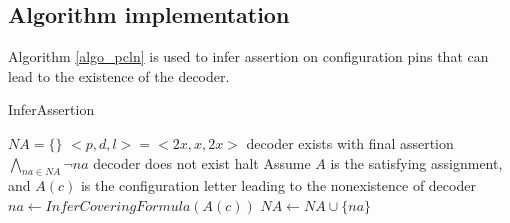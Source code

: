 \documentclass[journal]{IEEEtran}
\begin{document}
\subsection{Algorithm implementation}\label{subsec_algo}
Algorithm \ref{algo_pcln} is used to infer assertion on configuration pins that can lead to the existence of the decoder.

\begin{algorithm}
\caption{InferAssertion}
\label{algo_pcln}
\begin{algorithmic}[1]
\STATE $NA=\{\}$
\STATE $<p,d,l>=<2x,x,2x>$
\label{algo_pcln_pdl}
\label{algo_pcln_pc}
\STATE decoder exists with final assertion $\bigwedge_{na\in NA}\neg na$
\ELSE
\STATE decoder does not exist
\ENDIF
\STATE halt
\label{algo_pcln_halt}
\ELSE
{}
\label{algo_pcln_lnc}
\STATE Assume $A$ is the satisfying assignment, and $A(c)$ is the configuration letter leading to the nonexistence of decoder
\label{algo_pcln_Ac}
\STATE $na\leftarrow InferCoveringFormula(A(c))$
\label{algo_pcln_nainfer}
\STATE $NA\leftarrow NA\cup \{na\}$
\label{algo_pcln_ruleout}
\ENDWHILE
\ENDIF
\ENDFOR
\end{algorithmic}
\end{algorithm}
\end{document}

